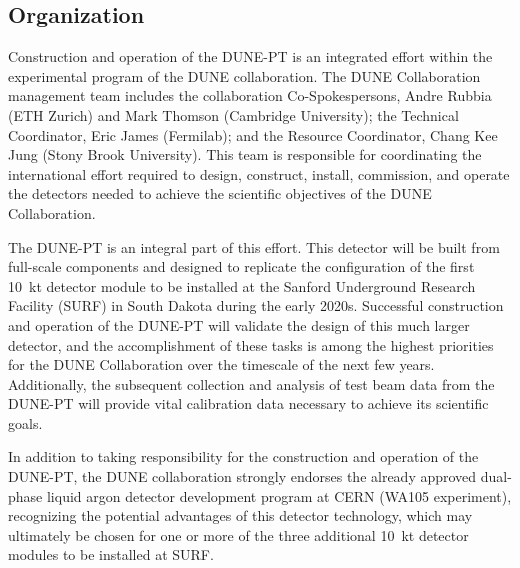 \label{organ}

\subsection{Organization}

Construction and operation of the DUNE-PT is an integrated effort within the experimental program of the DUNE collaboration.  
The DUNE Collaboration management team includes the collaboration Co-Spokespersons, Andre Rubbia (ETH Zurich) and Mark Thomson 
(Cambridge University); the Technical Coordinator, Eric James (Fermilab); and the Resource Coordinator, Chang Kee Jung (Stony 
Brook University).  This team is responsible for coordinating the international effort required to design, construct, install, 
commission, and operate the detectors needed to achieve the scientific objectives of the DUNE Collaboration.  

The DUNE-PT is an integral part of this effort.  This detector will be built from full-scale components and designed to replicate 
the configuration of the first 10~kt detector module to be installed at the Sanford Underground Research Facility (SURF) in 
South Dakota during the early 2020s.  Successful construction and operation of the DUNE-PT will validate the design of this much 
larger detector, and the accomplishment of these tasks is among the highest priorities for the DUNE Collaboration over the 
timescale of the next few years.  Additionally, the subsequent collection and analysis of test beam data from the DUNE-PT will 
provide vital calibration data necessary to achieve its scientific goals.

In addition to taking responsibility for the construction and operation of the DUNE-PT, the DUNE collaboration strongly endorses 
the already approved dual-phase liquid argon detector development program at CERN (WA105 experiment), recognizing the potential 
advantages of this detector technology, which may ultimately be chosen for one or more of the three additional 10~kt detector 
modules to be installed at SURF.     

